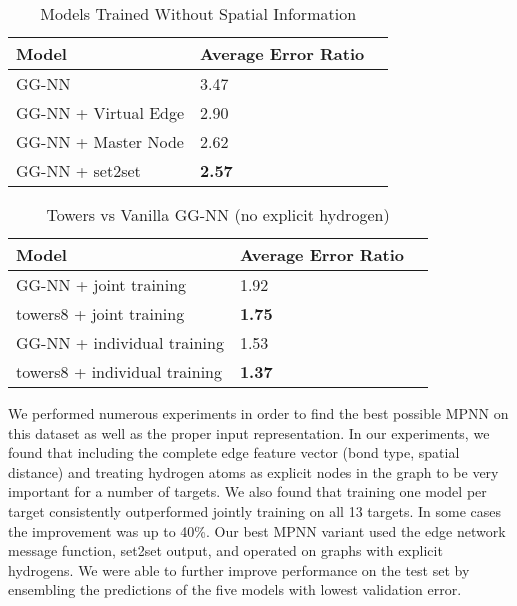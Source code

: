 \documentclass{article}
\begin{document}
\begin{table}[t]
\centering
\caption{Models Trained Without Spatial Information}
\label{tb:spatial}
\begin{tabular}{lll}
\hline
Model           & Average Error Ratio &  \\
\hline
GG-NN        & 3.47                &  \\
GG-NN + Virtual Edge        & 2.90                &  \\
GG-NN + Master Node & 2.62                &  \\
GG-NN + set2set    & \textbf{2.57}                & 
\end{tabular}


\end{table}

\begin{table}[t]
\centering
\caption{Towers vs Vanilla GG-NN (no explicit hydrogen)}
\label{tb:towers}
\begin{tabular}{lll}
\hline
Model          & Average Error Ratio &  \\
\hline
GG-NN + joint training    & 1.92                &  \\
towers8 + joint training & \textbf{1.75}               &  \\
\hline
GG-NN + individual training      & 1.53                &  \\
towers8 + individual training   & \textbf{1.37}             & 
\end{tabular}

\end{table}




We performed numerous experiments in order to find the best possible MPNN on this dataset as well as the proper input representation. In our experiments, we found that including the complete edge feature vector (bond type, spatial distance) and treating hydrogen atoms as explicit nodes in the graph to be very important for a number of targets. We also found that training one model per target consistently outperformed jointly training on all 13 targets. In some cases the improvement was up to 40\%. Our best MPNN variant used the edge network message function, set2set output, and operated on graphs with explicit hydrogens. We were able to further improve performance on the test set by ensembling the predictions of the five models with lowest validation error. 
\end{document}
